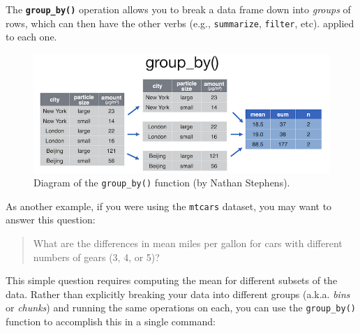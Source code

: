 \documentclass[]{book}
\newenvironment{Shaded}{\begin{snugshade}}{\end{snugshade}}
\newcommand{\KeywordTok}[1]{\textcolor[rgb]{0.13,0.29,0.53}{\textbf{#1}}}
\newcommand{\DataTypeTok}[1]{\textcolor[rgb]{0.13,0.29,0.53}{#1}}
\newcommand{\StringTok}[1]{\textcolor[rgb]{0.31,0.60,0.02}{#1}}
\newcommand{\CommentTok}[1]{\textcolor[rgb]{0.56,0.35,0.01}{\textit{#1}}}
\newcommand{\OperatorTok}[1]{\textcolor[rgb]{0.81,0.36,0.00}{\textbf{#1}}}
\newcommand{\NormalTok}[1]{#1}
\theoremstyle{definition}
\theoremstyle{definition}
\theoremstyle{remark}
\begin{document}
The \textbf{\texttt{group\_by()}} operation allows you to break a data
frame down into \emph{groups} of rows, which can then have the other
verbs (e.g., \texttt{summarize}, \texttt{filter}, etc). applied to each
one.

\begin{Shaded}
\end{Shaded}

\begin{figure}
\centering
\includegraphics{img/dplyr/group_by.png}
\caption{Diagram of the \texttt{group\_by()} function (by Nathan
Stephens).}
\end{figure}

As another example, if you were using the \texttt{mtcars} dataset, you
may want to answer this question:

\begin{quote}
What are the differences in mean miles per gallon for cars with
different numbers of gears (3, 4, or 5)?
\end{quote}

This simple question requires computing the mean for different subsets
of the data. Rather than explicitly breaking your data into different
groups (a.k.a. \emph{bins} or \emph{chunks}) and running the same
operations on each, you can use the \texttt{group\_by()} function to
accomplish this in a single command:

\begin{Shaded}
\end{Shaded}
\end{document}
